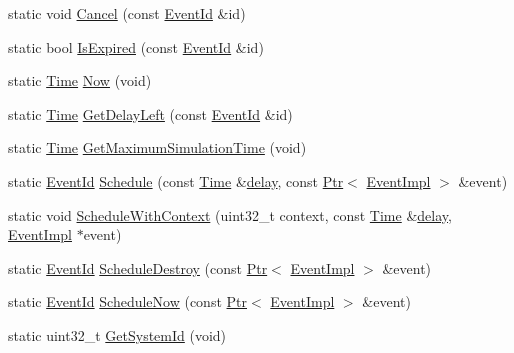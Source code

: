 \begin{DoxyCompactItemize}
\item 
static void \hyperlink{classns3_1_1Simulator_a1b903a62d6117ef28f7ba3c6500689bf}{Cancel} (const \hyperlink{classns3_1_1EventId}{Event\+Id} \&id)
\item 
static bool \hyperlink{classns3_1_1Simulator_a83ac8425c319a29b64f6d3b2ffc61e9c}{Is\+Expired} (const \hyperlink{classns3_1_1EventId}{Event\+Id} \&id)
\item 
static \hyperlink{classns3_1_1Time}{Time} \hyperlink{classns3_1_1Simulator_ac3178fa975b419f7875e7105be122800}{Now} (void)
\item 
static \hyperlink{classns3_1_1Time}{Time} \hyperlink{classns3_1_1Simulator_af2c7b4285454aa5062bd2df2bb7a7ab9}{Get\+Delay\+Left} (const \hyperlink{classns3_1_1EventId}{Event\+Id} \&id)
\item 
static \hyperlink{classns3_1_1Time}{Time} \hyperlink{classns3_1_1Simulator_aa8dbab888dca7bf3528421d2c5e67f99}{Get\+Maximum\+Simulation\+Time} (void)
\item 
static \hyperlink{classns3_1_1EventId}{Event\+Id} \hyperlink{classns3_1_1Simulator_a81c1ade622b5266d81908b2a99a330d2}{Schedule} (const \hyperlink{classns3_1_1Time}{Time} \&\hyperlink{mmwave_2model_2fading-traces_2fading__trace__generator_8m_a7964e6aa8f61a9d28973c8267a606ad8}{delay}, const \hyperlink{classns3_1_1Ptr}{Ptr}$<$ \hyperlink{classns3_1_1EventImpl}{Event\+Impl} $>$ \&event)
\item 
static void \hyperlink{classns3_1_1Simulator_a5ba9b2de598375791433f1bb9ba9ca83}{Schedule\+With\+Context} (uint32\+\_\+t context, const \hyperlink{classns3_1_1Time}{Time} \&\hyperlink{mmwave_2model_2fading-traces_2fading__trace__generator_8m_a7964e6aa8f61a9d28973c8267a606ad8}{delay}, \hyperlink{classns3_1_1EventImpl}{Event\+Impl} $\ast$event)
\item 
static \hyperlink{classns3_1_1EventId}{Event\+Id} \hyperlink{classns3_1_1Simulator_ab91bf34bb607a2c3145fd0f0200f865c}{Schedule\+Destroy} (const \hyperlink{classns3_1_1Ptr}{Ptr}$<$ \hyperlink{classns3_1_1EventImpl}{Event\+Impl} $>$ \&event)
\item 
static \hyperlink{classns3_1_1EventId}{Event\+Id} \hyperlink{classns3_1_1Simulator_af7d8e897bfd150f3113cf207be7742f6}{Schedule\+Now} (const \hyperlink{classns3_1_1Ptr}{Ptr}$<$ \hyperlink{classns3_1_1EventImpl}{Event\+Impl} $>$ \&event)
\item 
static uint32\+\_\+t \hyperlink{classns3_1_1Simulator_ac956436096243081b306fe4d95040d42}{Get\+System\+Id} (void)
\end{DoxyCompactItemize}
